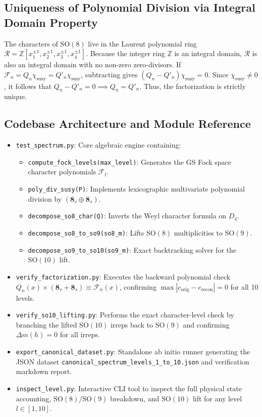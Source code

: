 \documentclass[11pt,a4paper]{article}
\begin{document}
\subsection{Uniqueness of Polynomial Division via Integral Domain Property}
The characters of $\mathrm{SO}(8)$ live in the Laurent polynomial ring $\mathcal{R} = \mathbb{Z}[x_1^{\pm 1}, x_2^{\pm 1}, x_3^{\pm 1}, x_4^{\pm 1}]$. Because the integer ring $\mathbb{Z}$ is an integral domain, $\mathcal{R}$ is also an integral domain with no non-zero zero-divisors.
If $\mathcal{F}_n = Q_n \chi_{\text{susy}} = Q'_n \chi_{\text{susy}}$, subtracting gives $(Q_n - Q'_n) \chi_{\text{susy}} = 0$. Since $\chi_{\text{susy}} \neq 0$, it follows that $Q_n - Q'_n = 0 \implies Q_n = Q'_n$. Thus, the factorization is strictly unique.

\subsection{Codebase Architecture and Module Reference}
\begin{itemize}
    \item \texttt{test\_spectrum.py}: Core algebraic engine containing:
    \begin{itemize}
        \item \texttt{compute\_fock\_levels(max\_level)}: Generates the GS Fock space character polynomials $\mathcal{F}_l$.
        \item \texttt{poly\_div\_susy(P)}: Implements lexicographic multivariate polynomial division by $(\mathbf{8}_v \oplus \mathbf{8}_s)$.
        \item \texttt{decompose\_so8\_char(Q)}: Inverts the Weyl character formula on $D_4$.
        \item \texttt{decompose\_so8\_to\_so9(so8\_m)}: Lifts $\mathrm{SO}(8)$ multiplicities to $\mathrm{SO}(9)$.
        \item \texttt{decompose\_so9\_to\_so10(so9\_m)}: Exact backtracking solver for the $\mathrm{SO}(10)$ lift.
    \end{itemize}
    \item \texttt{verify\_factorization.py}: Executes the backward polynomial check $Q_n(x) \times (\mathbf{8}_v + \mathbf{8}_s) \equiv \mathcal{F}_n(x)$, confirming $\max |c_{\text{orig}} - c_{\text{recon}}| = 0$ for all 10 levels.
    \item \texttt{verify\_so10\_lifting.py}: Performs the exact character-level check by branching the lifted $\mathrm{SO}(10)$ irreps back to $\mathrm{SO}(9)$ and confirming $\Delta m(h) = 0$ for all irreps.
    \item \texttt{export\_canonical\_dataset.py}: Standalone ab initio runner generating the JSON dataset \texttt{canonical\_spectrum\_levels\_1\_to\_10.json} and verification markdown report.
    \item \texttt{inspect\_level.py}: Interactive CLI tool to inspect the full physical state accounting, $\mathrm{SO}(8)/\mathrm{SO}(9)$ breakdown, and $\mathrm{SO}(10)$ lift for any level $l \in [1, 10]$.
\end{itemize}
\end{document}

